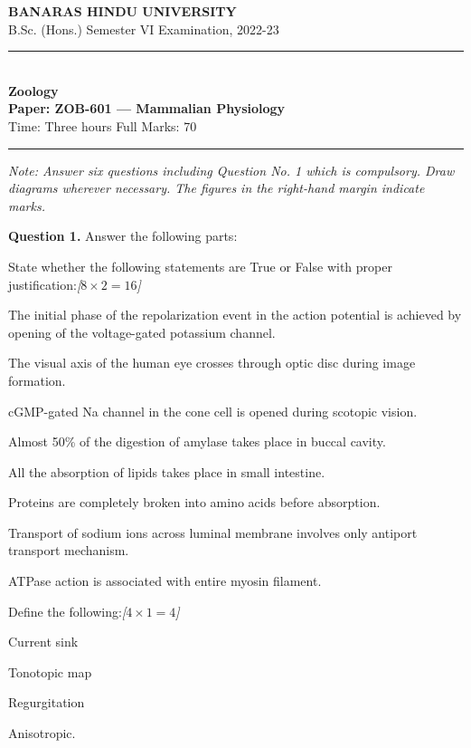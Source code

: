 \documentclass[11pt,a4paper]{article}
\newcommand{\pts}[1]{\hfill   \textit{[#1]}}
\begin{document}
\begin{center}
  {\large\bfseries BANARAS HINDU UNIVERSITY}\\[2pt]
  {\normalsize B.Sc. (Hons.) Semester VI Examination, 2022-23}\\[6pt]
  \rule{0.8\linewidth}{0.5pt}\\[6pt]
  {\large\bfseries Zoology}\\[4pt]
  {\large\bfseries Paper: ZOB-601 --- Mammalian Physiology}\\[4pt]
  {\normalsize Time: Three hours \hfill Full Marks: 70}
\end{center}

\rule{\linewidth}{0.4pt}

\smallskip



\noindent   \textit{Note: Answer six questions including Question No. 1 which is compulsory. Draw diagrams wherever necessary. The figures in the right-hand margin indicate marks.}

\bigskip




\noindent   \textbf{Question 1.} Answer the following parts:

\begin{parts}
  \item State whether the following statements are True or False with proper justification:\pts{$8  \times 2 = 16$}
  
\begin{parts}
    \item The initial phase of the repolarization event in the action potential is achieved by opening of the voltage-gated potassium channel.
    \item The visual axis of the human eye crosses through optic disc during image formation.
    \item cGMP-gated Na channel in the cone cell is opened during scotopic vision.
    \item Almost 50\% of the digestion of amylase takes place in buccal cavity.
    \item All the absorption of lipids takes place in small intestine.
    \item Proteins are completely broken into amino acids before absorption.
    \item Transport of sodium ions across luminal membrane involves only antiport transport mechanism.
    \item ATPase action is associated with entire myosin filament.
  \end{parts}
  
  \item Define the following:\pts{$4  \times 1 = 4$}
  
\begin{parts}
    \item Current sink
    \item Tonotopic map
    \item Regurgitation
    \item Anisotropic.
  \end{parts}
\end{parts}
\end{document}
